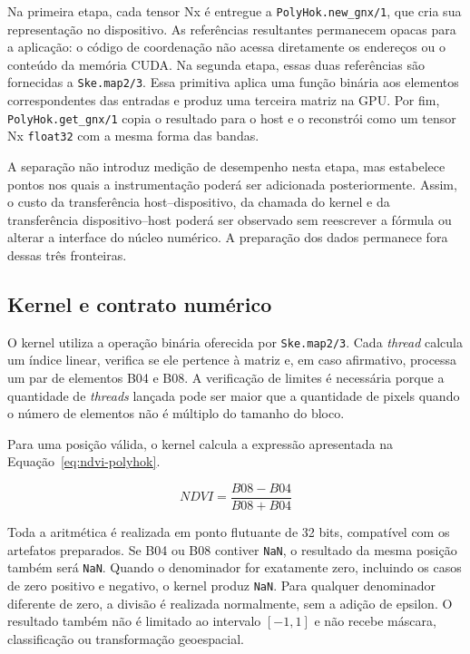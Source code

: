 \documentclass[tcc,capa]{texufpel}
\begin{document}
Na primeira etapa, cada tensor Nx é entregue a \texttt{PolyHok.new\_gnx/1}, que
cria sua representação no dispositivo. As referências resultantes permanecem
opacas para a aplicação: o código de coordenação não acessa diretamente os
endereços ou o conteúdo da memória CUDA. Na segunda etapa, essas duas referências
são fornecidas a \texttt{Ske.map2/3}. Essa primitiva aplica uma função binária aos
elementos correspondentes das entradas e produz uma terceira matriz na GPU. Por
fim, \texttt{PolyHok.get\_gnx/1} copia o resultado para o host e o reconstrói como
um tensor Nx \texttt{float32} com a mesma forma das bandas.

A separação não introduz medição de desempenho nesta etapa, mas estabelece pontos
nos quais a instrumentação poderá ser adicionada posteriormente. Assim, o custo da
transferência host--dispositivo, da chamada do kernel e da transferência
dispositivo--host poderá ser observado sem reescrever a fórmula ou alterar a
interface do núcleo numérico. A preparação dos dados permanece fora dessas três
fronteiras.

\subsection{Kernel e contrato numérico}

O kernel utiliza a operação binária oferecida por \texttt{Ske.map2/3}. Cada
\textit{thread} calcula um índice linear, verifica se ele pertence à matriz e, em
caso afirmativo, processa um par de elementos B04 e B08. A verificação de
limites é necessária porque a quantidade de \textit{threads} lançada pode ser
maior que a quantidade de pixels quando o número de elementos não é múltiplo do
tamanho do bloco.

Para uma posição válida, o kernel calcula a expressão apresentada na
Equação~\ref{eq:ndvi-polyhok}.

\begin{equation}
\label{eq:ndvi-polyhok}
NDVI = \frac{B08 - B04}{B08 + B04}
\end{equation}

Toda a aritmética é realizada em ponto flutuante de 32 bits, compatível com os
artefatos preparados. Se B04 ou B08 contiver \texttt{NaN}, o resultado da mesma
posição também será \texttt{NaN}. Quando o denominador for exatamente zero,
incluindo os casos de zero positivo e negativo, o kernel produz \texttt{NaN}. Para
qualquer denominador diferente de zero, a divisão é realizada normalmente, sem a
adição de epsilon. O resultado também não é limitado ao intervalo $[-1,1]$ e não
recebe máscara, classificação ou transformação geoespacial.
\end{document}
